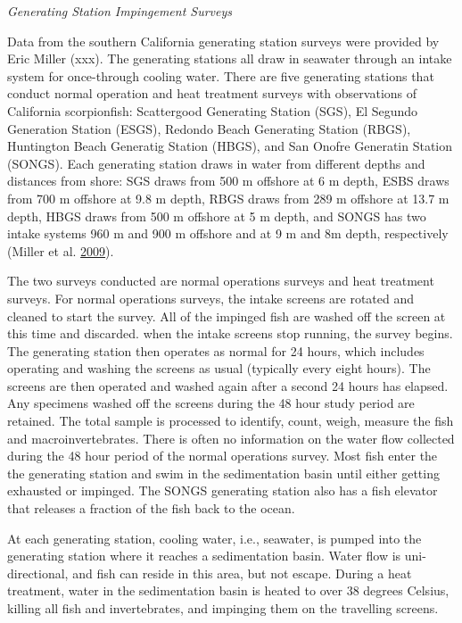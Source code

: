 \documentclass[12pt,]{article}
\begin{document}
\emph{Generating Station Impingement Surveys}

Data from the southern California generating station surveys were
provided by Eric Miller (xxx). The generating stations all draw in
seawater through an intake system for once-through cooling water. There
are five generating stations that conduct normal operation and heat
treatment surveys with observations of California scorpionfish:
Scattergood Generating Station (SGS), El Segundo Generation Station
(ESGS), Redondo Beach Generating Station (RBGS), Huntington Beach
Generatig Station (HBGS), and San Onofre Generatin Station (SONGS). Each
generating station draws in water from different depths and distances
from shore: SGS draws from 500 m offshore at 6 m depth, ESBS draws from
700 m offshore at 9.8 m depth, RBGS draws from 289 m offshore at 13.7 m
depth, HBGS draws from 500 m offshore at 5 m depth, and SONGS has two
intake systems 960 m and 900 m offshore and at 9 m and 8m depth,
respectively (Miller et al. \protect\hyperlink{ref-Miller2009}{2009}).

The two surveys conducted are normal operations surveys and heat
treatment surveys. For normal operations surveys, the intake screens are
rotated and cleaned to start the survey. All of the impinged fish are
washed off the screen at this time and discarded. when the intake
screens stop running, the survey begins. The generating station then
operates as normal for 24 hours, which includes operating and washing
the screens as usual (typically every eight hours). The screens are then
operated and washed again after a second 24 hours has elapsed. Any
specimens washed off the screens during the 48 hour study period are
retained. The total sample is processed to identify, count, weigh,
measure the fish and macroinvertebrates. There is often no information
on the water flow collected during the 48 hour period of the normal
operations survey. Most fish enter the the generating station and swim
in the sedimentation basin until either getting exhausted or impinged.
The SONGS generating station also has a fish elevator that releases a
fraction of the fish back to the ocean.

At each generating station, cooling water, i.e., seawater, is pumped
into the generating station where it reaches a sedimentation basin.
Water flow is uni-directional, and fish can reside in this area, but not
escape. During a heat treatment, water in the sedimentation basin is
heated to over 38 degrees Celsius, killing all fish and invertebrates,
and impinging them on the travelling screens.
\end{document}
